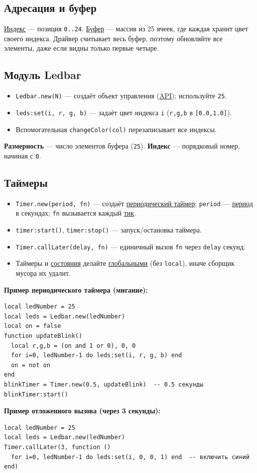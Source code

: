 \documentclass[a4paper,12pt]{article}
\begin{document}
\subsection{Адресация и буфер}
\hyperlink{term:index}{Индекс} — позиция \verb|0..24|. \hyperlink{term:buffer}{Буфер} — массив из 25 ячеек, где каждая хранит цвет своего индекса. Драйвер считывает весь буфер, поэтому обновляйте все элементы, даже если видны только первые четыре.

\subsection{Модуль Ledbar}
\begin{itemize}
  \item \verb|Ledbar.new(N)| — создаёт объект управления (\hyperlink{term:api}{API}); используйте \verb|25|.
  \item \verb|leds:set(i, r, g, b)| — задаёт цвет индекса \verb|i| (\verb|r,g,b| в \verb|[0.0,1.0]|).
  \item Вспомогательная \verb|changeColor(col)| перезаписывает все индексы.
\end{itemize}
\textbf{Размерность} — число элементов буфера (\verb|25|). \textbf{Индекс} — порядковый номер, начиная с \verb|0|.

\subsection{Таймеры}
\begin{itemize}
  \item \verb|Timer.new(period, fn)| — создаёт \hyperlink{term:timer}{периодический таймер}; \verb|period| — \hyperlink{term:period}{период} в секундах; \verb|fn| вызывается каждый \hyperlink{term:tick}{тик}.
  \item \verb|timer:start()|, \verb|timer:stop()| — запуск/остановка таймера.
  \item \verb|Timer.callLater(delay, fn)| — единичный вызов \verb|fn| через \verb|delay| секунд.
  \item Таймеры и \hyperlink{term:state}{состояния} делайте \hyperlink{term:scope}{глобальными} (без \verb|local|), иначе сборщик мусора их удалит.
\end{itemize}
\textbf{Пример периодического таймера (мигание):}
\begin{lstlisting}[style=lua]
local ledNumber = 25
local leds = Ledbar.new(ledNumber)
local on = false
function updateBlink()
  local r,g,b = (on and 1 or 0), 0, 0
  for i=0, ledNumber-1 do leds:set(i, r, g, b) end
  on = not on
end
blinkTimer = Timer.new(0.5, updateBlink)  -- 0.5 секунды
blinkTimer:start()
\end{lstlisting}
\textbf{Пример отложенного вызова (через 3 секунды):}
\begin{lstlisting}[style=lua]
local ledNumber = 25
local leds = Ledbar.new(ledNumber)
Timer.callLater(3, function ()
  for i=0, ledNumber-1 do leds:set(i, 0, 0, 1) end  -- включить синий
end)
\end{lstlisting}
\end{document}
